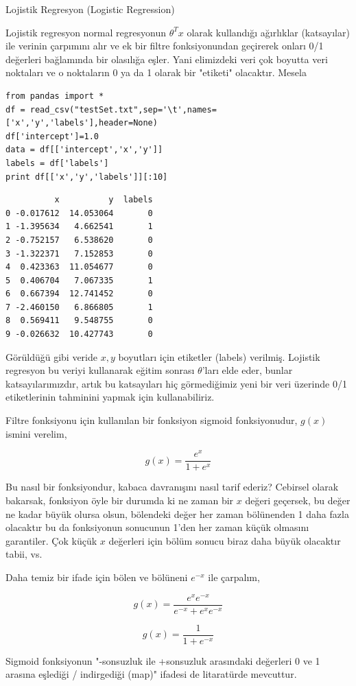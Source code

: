 \documentclass[12pt,fleqn]{article}\usepackage{../../common}
\begin{document}
Lojistik Regresyon (Logistic Regression)

Lojistik regresyon normal regresyonun $\theta^T x$ olarak kullandığı ağırlıklar
(katsayılar) ile verinin çarpımını alır ve ek bir filtre fonksiyonundan
geçirerek onları 0/1 değerleri bağlamında bir olasılığa eşler. Yani elimizdeki
veri çok boyutta veri noktaları ve o noktaların 0 ya da 1 olarak bir
"etiketi" olacaktır. Mesela

\begin{verbatim}
from pandas import *
df = read_csv("testSet.txt",sep='\t',names=['x','y','labels'],header=None)
df['intercept']=1.0
data = df[['intercept','x','y']]
labels = df['labels']
print df[['x','y','labels']][:10]
\end{verbatim}

\begin{verbatim}
          x          y  labels
0 -0.017612  14.053064       0
1 -1.395634   4.662541       1
2 -0.752157   6.538620       0
3 -1.322371   7.152853       0
4  0.423363  11.054677       0
5  0.406704   7.067335       1
6  0.667394  12.741452       0
7 -2.460150   6.866805       1
8  0.569411   9.548755       0
9 -0.026632  10.427743       0
\end{verbatim}

Görüldüğü gibi veride $x,y$ boyutları için etiketler (labels) verilmiş. Lojistik
regresyon bu veriyi kullanarak eğitim sonrası $\theta$'ları elde eder, bunlar
katsayılarımızdır, artık bu katsayıları hiç görmediğimiz yeni bir veri üzerinde
0/1 etiketlerinin tahminini yapmak için kullanabiliriz.

Filtre fonksiyonu için kullanılan bir fonksiyon sigmoid fonksiyonudur,
$g(x)$ ismini verelim,

$$ g(x) = \frac{e^{x}}{1+e^{x}} $$

Bu nasıl bir fonksiyondur, kabaca davranışını nasıl tarif ederiz?  Cebirsel
olarak bakarsak, fonksiyon öyle bir durumda ki ne zaman bir $x$ değeri geçersek,
bu değer ne kadar büyük olursa olsun, bölendeki değer her zaman bölünenden 1
daha fazla olacaktır bu da fonksiyonun sonucunun 1'den her zaman küçük olmasını
garantiler. Çok küçük $x$ değerleri için bölüm sonucu biraz daha büyük olacaktır
tabii, vs.

Daha temiz bir ifade için bölen ve bölüneni $e^{-x}$ ile çarpalım,

$$ g(x) = \frac{e^{x}e^{-x}}{e^{-x}+e^{x}e^{-x}} $$

$$ g(x) = \frac{1}{1+e^{-x}} $$

Sigmoid fonksiyonun "-sonsuzluk ile +sonsuzluk arasındaki değerleri 0 ve 1
arasına eşlediği / indirgediği (map)" ifadesi de litaratürde mevcuttur.
\end{document}
